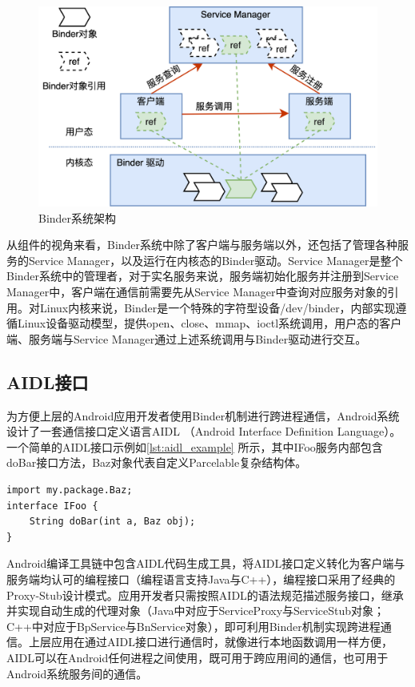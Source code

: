 \documentclass[winfonts,master,twoside]{njuthesis}
\begin{document}
\begin{figure}
	\centering
	\includegraphics[width=\textwidth]{figure/2-background/binder-arch.png}
	\caption{Binder系统架构}
	\label{binder-arch}
\end{figure}

从组件的视角来看，Binder系统中除了客户端与服务端以外，还包括了管理各种服务的Service Manager，以及运行在内核态的Binder驱动。Service Manager是整个Binder系统中的管理者，对于实名服务来说，服务端初始化服务并注册到Service Manager中，客户端在通信前需要先从Service Manager中查询对应服务对象的引用。对Linux内核来说，Binder是一个特殊的字符型设备/dev/binder，内部实现遵循Linux设备驱动模型，提供open、close、mmap、ioctl系统调用，用户态的客户端、服务端与Service Manager通过上述系统调用与Binder驱动进行交互。

\subsection{AIDL接口}

为方便上层的Android应用开发者使用Binder机制进行跨进程通信，Android系统设计了一套通信接口定义语言AIDL \cite{aidl}（Android Interface Definition Language）。一个简单的AIDL接口示例如\ref{lst:aidl_example} 所示，其中IFoo服务内部包含doBar接口方法，Baz对象代表自定义Parcelable复杂结构体。

\begin{lstlisting}[caption={AIDL接口示例},label={lst:aidl_example}] 
import my.package.Baz;
interface IFoo {
    String doBar(int a, Baz obj);
}
\end{lstlisting}

Android编译工具链中包含AIDL代码生成工具，将AIDL接口定义转化为客户端与服务端均认可的编程接口（编程语言支持Java与C++），编程接口采用了经典的Proxy-Stub设计模式。应用开发者只需按照AIDL的语法规范描述服务接口，继承并实现自动生成的代理对象（Java中对应于ServiceProxy与ServiceStub对象；C++中对应于BpService与BnService对象），即可利用Binder机制实现跨进程通信。上层应用在通过AIDL接口进行通信时，就像进行本地函数调用一样方便，AIDL可以在Android任何进程之间使用，既可用于跨应用间的通信，也可用于Android系统服务间的通信。
\end{document}
